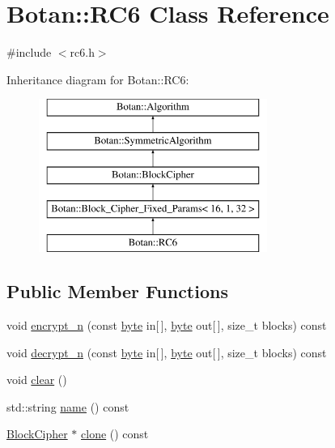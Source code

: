 \hypertarget{classBotan_1_1RC6}{\section{Botan\-:\-:R\-C6 Class Reference}
\label{classBotan_1_1RC6}
}


{\ttfamily \#include $<$rc6.\-h$>$}

Inheritance diagram for Botan\-:\-:R\-C6\-:\begin{figure}[H]
\begin{center}
\leavevmode
\includegraphics[height=5.000000cm]{classBotan_1_1RC6}
\end{center}
\end{figure}
\subsection*{Public Member Functions}
\begin{DoxyCompactItemize}
\item 
void \hyperlink{classBotan_1_1RC6_ae616f9ea4e287dd9426a574b73c56870}{encrypt\-\_\-n} (const \hyperlink{namespaceBotan_a7d793989d801281df48c6b19616b8b84}{byte} in\mbox{[}$\,$\mbox{]}, \hyperlink{namespaceBotan_a7d793989d801281df48c6b19616b8b84}{byte} out\mbox{[}$\,$\mbox{]}, size\-\_\-t blocks) const 
\item 
void \hyperlink{classBotan_1_1RC6_a411d0f6dcd1f5e5e1e71e25570a1cb88}{decrypt\-\_\-n} (const \hyperlink{namespaceBotan_a7d793989d801281df48c6b19616b8b84}{byte} in\mbox{[}$\,$\mbox{]}, \hyperlink{namespaceBotan_a7d793989d801281df48c6b19616b8b84}{byte} out\mbox{[}$\,$\mbox{]}, size\-\_\-t blocks) const 
\item 
void \hyperlink{classBotan_1_1RC6_a966e64755e00cba21238911c269ac079}{clear} ()
\item 
std\-::string \hyperlink{classBotan_1_1RC6_abe5b1670c07e6207cf049efa1f103f65}{name} () const 
\item 
\hyperlink{classBotan_1_1BlockCipher}{Block\-Cipher} $\ast$ \hyperlink{classBotan_1_1RC6_a2061f73d1f5f315b915a7f7206d16074}{clone} () const 
\end{DoxyCompactItemize}
